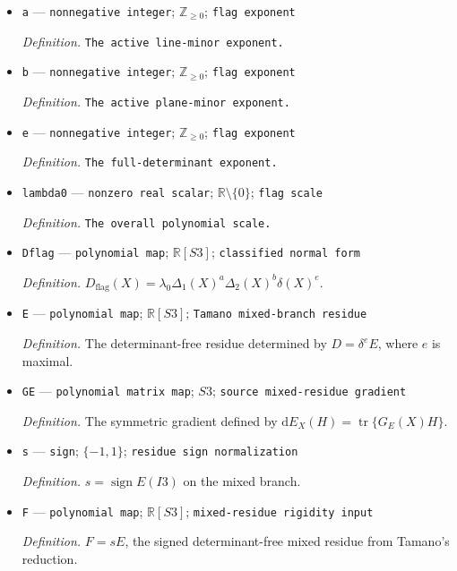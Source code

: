 \documentclass{article}
\begin{document}
\begin{itemize}
  \par\smallskip\noindent\emph{Definition.} \(\Delta_2(X)=\det(B2XB2^{\top})\).
  \item \texttt{a} --- \texttt{nonnegative integer}; \(\mathbb Z_{\geq0}\); \texttt{flag exponent}
  \par\smallskip\noindent\emph{Definition.} \texttt{The active line-\allowbreak{}minor exponent.}
  \item \texttt{b} --- \texttt{nonnegative integer}; \(\mathbb Z_{\geq0}\); \texttt{flag exponent}
  \par\smallskip\noindent\emph{Definition.} \texttt{The active plane-\allowbreak{}minor exponent.}
  \item \texttt{e} --- \texttt{nonnegative integer}; \(\mathbb Z_{\geq0}\); \texttt{flag exponent}
  \par\smallskip\noindent\emph{Definition.} \texttt{The full-\allowbreak{}determinant exponent.}
  \item \texttt{lambda0} --- \texttt{nonzero real scalar}; \(\mathbb R\setminus\{0\}\); \texttt{flag scale}
  \par\smallskip\noindent\emph{Definition.} \texttt{The overall polynomial scale.}
  \item \texttt{Dflag} --- \texttt{polynomial map}; \(\mathbb R[S3]\); \texttt{classified normal form}
  \par\smallskip\noindent\emph{Definition.} \(D_{\mathrm{flag}}(X)=\lambda_0\Delta_1(X)^a\Delta_2(X)^b\delta(X)^e\).
  \item \texttt{E} --- \texttt{polynomial map}; \(\mathbb R[S3]\); \texttt{Tamano mixed-\allowbreak{}branch residue}
  \par\smallskip\noindent\emph{Definition.} The determinant-free residue determined by \(D=\delta^eE\), where \(e\) is maximal.
  \item \texttt{GE} --- \texttt{polynomial matrix map}; \(S3\); \texttt{source mixed-\allowbreak{}residue gradient}
  \par\smallskip\noindent\emph{Definition.} The symmetric gradient defined by \(\mathrm dE_X(H)=\operatorname{tr}\{G_E(X)H\}\).
  \item \texttt{s} --- \texttt{sign}; \(\{-1,1\}\); \texttt{residue sign normalization}
  \par\smallskip\noindent\emph{Definition.} \(s=\operatorname{sign}E(I3)\) on the mixed branch.
  \item \texttt{F} --- \texttt{polynomial map}; \(\mathbb R[S3]\); \texttt{mixed-\allowbreak{}residue rigidity input}
  \par\smallskip\noindent\emph{Definition.} \(F=sE\), the signed determinant-free mixed residue from Tamano's reduction.

\end{itemize}
\end{document}

